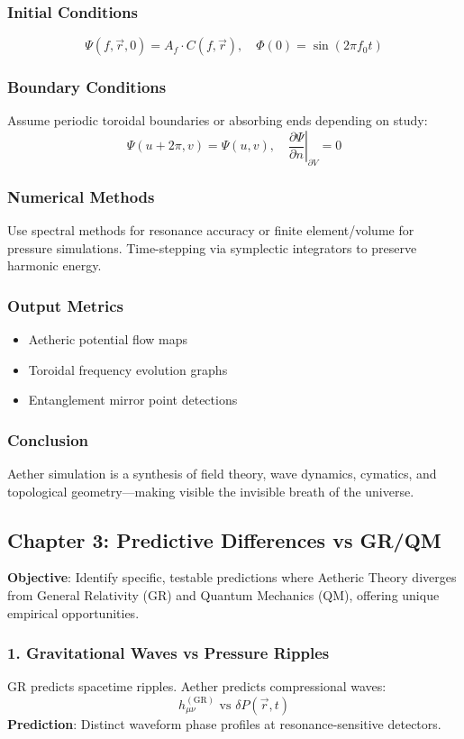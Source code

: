 \subsubsection*{Initial Conditions}
\[
\Psi(f, \vec{r}, 0) = A_f \cdot C(f, \vec{r}), \quad \Phi(0) = \sin \left( 2 \pi f_0 t \right)
\]

\subsubsection*{Boundary Conditions}
Assume periodic toroidal boundaries or absorbing ends depending on study:
\[
\Psi(u + 2 \pi, v) = \Psi(u, v), \quad \left. \frac{\partial \Psi}{\partial n} \right|_{\partial V} = 0
\]

\subsubsection*{Numerical Methods}
Use spectral methods for resonance accuracy or finite element/volume for pressure simulations. Time-stepping via symplectic integrators to preserve harmonic energy.

\subsubsection*{Output Metrics}
\begin{itemize}
    \item Aetheric potential flow maps
    \item Toroidal frequency evolution graphs
    \item Entanglement mirror point detections
\end{itemize}

\subsubsection*{Conclusion}
Aether simulation is a synthesis of field theory, wave dynamics, cymatics, and topological geometry—making visible the invisible breath of the universe.

\subsection{Chapter 3: Predictive Differences vs GR/QM}
\textbf{Objective}: Identify specific, testable predictions where Aetheric Theory diverges from General Relativity (GR) and Quantum Mechanics (QM), offering unique empirical opportunities.

\subsubsection*{1. Gravitational Waves vs Pressure Ripples}
GR predicts spacetime ripples. Aether predicts compressional waves:
\[
h_{\mu \nu}^{(\mathrm{GR})} \text{ vs } \delta P(\vec{r}, t)
\]
\textbf{Prediction}: Distinct waveform phase profiles at resonance-sensitive detectors.

